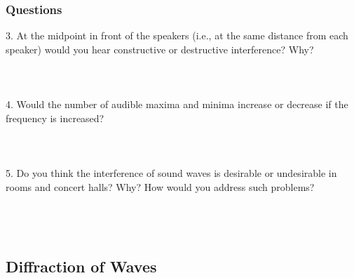\documentclass[11pt]{NSF}
\begin{document}
\subsubsection*{Questions}

3.	 At the midpoint in front of the speakers (i.e., at the 
same distance from each speaker) would you hear 
constructive or destructive interference? Why?
\\
\\
\\
\\
4.	 Would the number of audible maxima and minima 
increase or decrease if the frequency is increased?
\\
\\
\\
\\
5.	 Do you think the interference of sound waves is desirable 
or undesirable in rooms and concert halls?  
Why? How would you address such problems?
\\
\\
\\
\\

\subsection{Diffraction of Waves}
\end{document}
